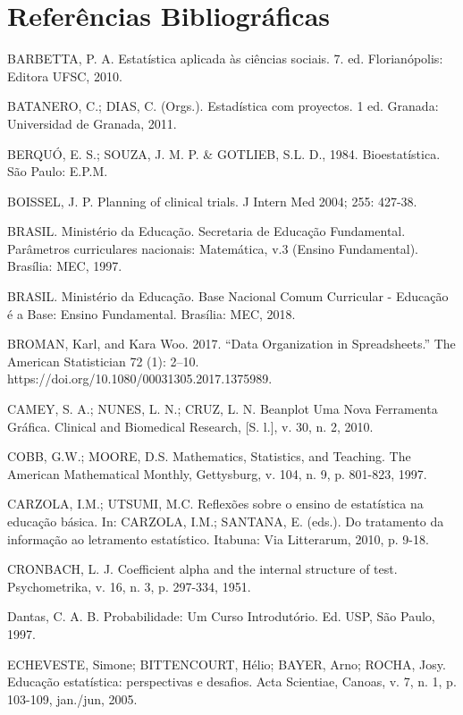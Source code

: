 \chapter{Referências Bibliográficas}

BARBETTA, P. A. Estatística aplicada às ciências sociais. 7. ed. Florianópolis: Editora UFSC, 2010.\vskip0.3cm

BATANERO, C.; DIAS, C. (Orgs.). Estadística com proyectos. 1 ed. Granada: Universidad de Granada, 2011.\vskip0.3cm

BERQUÓ, E. S.; SOUZA, J. M. P. & GOTLIEB, S.L. D., 1984. Bioestatística. São Paulo: E.P.M. \vskip0.3cm

BOISSEL, J. P. Planning of clinical trials. J Intern Med 2004; 255: 427-38.\vskip0.3cm

BRASIL. Ministério da Educação. Secretaria de Educação Fundamental. Parâmetros curriculares nacionais: Matemática, v.3 (Ensino Fundamental). Brasília: MEC, 1997. \vskip0.3cm

BRASIL. Ministério da Educação. Base Nacional Comum Curricular - Educação é a Base: Ensino Fundamental. Brasília: MEC, 2018.\vskip0.3cm

BROMAN, Karl, and Kara Woo. 2017. “Data Organization in Spreadsheets.” The American Statistician 72 (1): 2–10. https://doi.org/10.1080/00031305.2017.1375989.\vskip0.3cm

CAMEY, S. A.; NUNES, L. N.; CRUZ, L. N. Beanplot Uma Nova Ferramenta Gráfica. Clinical and Biomedical Research, [S. l.], v. 30, n. 2, 2010.\vskip0.3cm

COBB, G.W.; MOORE, D.S. Mathematics, Statistics, and Teaching. The American Mathematical Monthly, Gettysburg, v. 104, n. 9, p. 801-823, 1997.\vskip0.3cm

CARZOLA, I.M.; UTSUMI, M.C. Reflexões sobre o ensino de estatística na educação básica. In: CARZOLA, I.M.; SANTANA, E. (eds.). Do tratamento da informação ao letramento estatístico. Itabuna: Via Litterarum, 2010, p. 9-18.\vskip0.3cm

CRONBACH, L. J. Coefficient alpha and the internal structure of test. Psychometrika, v. 16, n. 3, p. 297-334, 1951.\vskip0.3cm

Dantas, C. A. B. Probabilidade: Um Curso Introdutório. Ed.
USP, São Paulo, 1997.\vskip0.3cm

ECHEVESTE, Simone; BITTENCOURT, Hélio; BAYER, Arno; ROCHA, Josy. Educação estatística: perspectivas e desafios. Acta Scientiae, Canoas, v. 7, n. 1, p. 103-109, jan./jun, 2005.\vskip0.3cm

